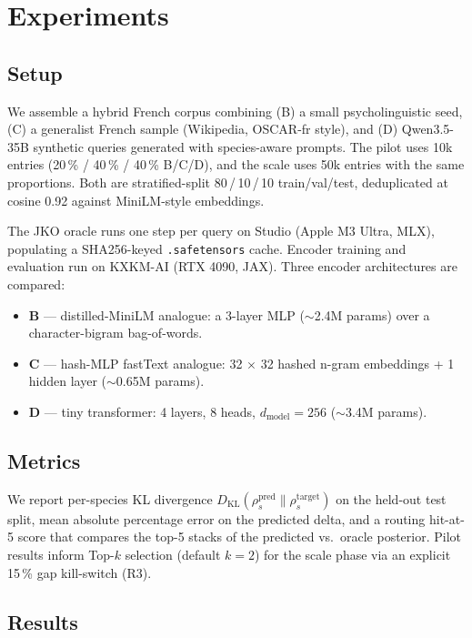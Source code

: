 \section{Experiments}
\label{sec:experiments}

\subsection{Setup}

We assemble a hybrid French corpus combining (B) a small psycholinguistic seed, (C) a generalist French sample (Wikipedia, OSCAR-fr style), and (D) Qwen3.5-35B synthetic queries generated with species-aware prompts. The pilot uses 10k entries (20\,\% / 40\,\% / 40\,\% B/C/D), and the scale uses 50k entries with the same proportions. Both are stratified-split 80\,/\,10\,/\,10 train/val/test, deduplicated at cosine 0.92 against MiniLM-style embeddings.

The JKO oracle runs one step per query on Studio (Apple M3 Ultra, MLX), populating a SHA256-keyed \texttt{.safetensors} cache. Encoder training and evaluation run on KXKM-AI (RTX 4090, JAX). Three encoder architectures are compared:

\begin{itemize}
    \item \textbf{B} --- distilled-MiniLM analogue: a 3-layer MLP (\(\sim\)2.4M params) over a character-bigram bag-of-words.
    \item \textbf{C} --- hash-MLP fastText analogue: 32 \(\times\) 32 hashed n-gram embeddings + 1 hidden layer (\(\sim\)0.65M params).
    \item \textbf{D} --- tiny transformer: 4 layers, 8 heads, \(d_{\mathrm{model}} = 256\) (\(\sim\)3.4M params).
\end{itemize}

\subsection{Metrics}

We report per-species KL divergence \( D_{\mathrm{KL}}(\rho^{\mathrm{pred}}_s \| \rho^{\mathrm{target}}_s) \) on the held-out test split, mean absolute percentage error on the predicted delta, and a routing hit-at-5 score that compares the top-5 stacks of the predicted vs.\ oracle posterior. Pilot results inform Top-\(k\) selection (default \(k=2\)) for the scale phase via an explicit 15\,\% gap kill-switch (R3).

\subsection{Results}

